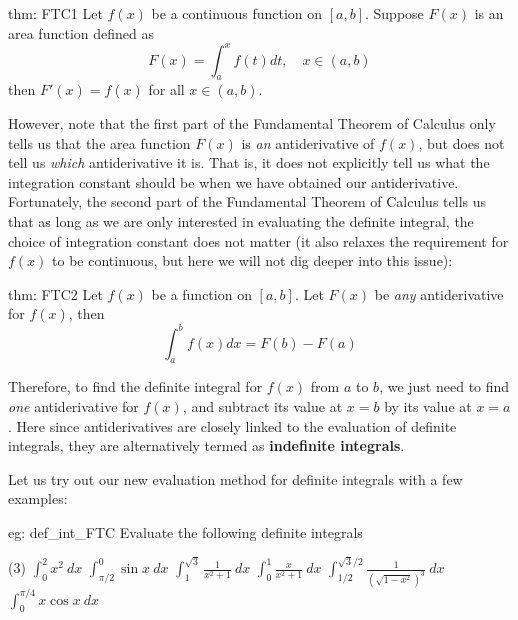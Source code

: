 \begin{theo}{thm: FTC1}
    Let $f(x)$ be a continuous function on $[a, b]$. Suppose $F(x)$ is an area function defined as 
    \[F(x) = \int_a^x f(t) dt, \quad x \in (a,b)\]
    then $F'(x) = f(x)$ for all $x \in (a,b)$.
\end{theo}

However, note that the first part of the Fundamental Theorem of Calculus only tells us that the area function $F(x)$ is \textit{an} antiderivative of $f(x)$, but does not tell us \textit{which} antiderivative it is.  That is, it does not explicitly tell us what the integration constant should be when we have obtained our antiderivative.  Fortunately, the second part of the Fundamental Theorem of Calculus tells us that as long as we are only interested in evaluating the definite integral, the choice of integration constant does not matter (it also relaxes the requirement for $f(x)$ to be continuous, but here we will not dig deeper into this issue):

\medskip
\begin{theo}{thm: FTC2}
    Let $f(x)$ be a function on $[a, b]$.  Let $F(x)$ be \textit{any} antiderivative for $f(x)$, then
    \[\int_a^b f(x) dx = F(b) - F(a)\]
\end{theo}

Therefore, to find the definite integral for $f(x)$ from $a$ to $b$, we just need to find \textit{one} antiderivative for $f(x)$, and subtract its value at $x = b$ by its value at $x = a$.  Here since antiderivatives are closely linked to the evaluation of definite integrals, they are alternatively termed as \textbf{indefinite integrals}.

Let us try out our new evaluation method for definite integrals with a few examples:

\begin{eg}[]{eg: def_int_FTC}
    Evaluate the following definite integrals
    \begin{tasks}(3)
        \task $\int_0^2 x^2~dx$
        \task $\int_{\pi/2}^{0} \sin x~dx$
        \task $\int_1^{\sqrt{3}} \frac{1}{x^2+1}~dx$
        \task $\int_0^1 \frac{x}{x^2+1}~dx$
        \task $\int_{1/2}^{\sqrt{3}/2} \frac{1}{(\sqrt{1-x^2})^3}~dx$
        \task $\int_{0}^{\pi/4} x \cos x~dx$
    \end{tasks}
\end{eg}

